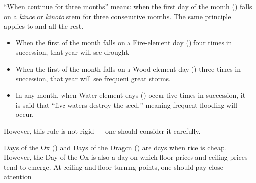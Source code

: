 \commentary
``When  continue for three months'' means: when the first
day of the month () falls on a \textit{kinoe} or
\textit{kinoto} stem for three consecutive months. The same principle
applies to  and all the rest.


\begin{sokyubox}
{\small\itshape\color{sokyubar} }

\medskip
\begin{itemize}[nosep]
\item When the first of the month falls on a Fire-element day () four times in succession, that year will see drought.
\item When the first of the month falls on a Wood-element day () three times in succession, that year will see frequent great storms.
\item In any month, when Water-element days () occur five times in succession, it is said that ``five waters destroy the seed,'' meaning frequent flooding will occur.
\end{itemize}

\medskip
However, this rule is not rigid --- one should consider it carefully.
\end{sokyubox}


\begin{sokyubox}
{\small\itshape\color{sokyubar} }

\medskip
Days of the Ox () and Days of the Dragon
() are days when rice is cheap. However, the
Day of the Ox is also a day on which floor prices and ceiling prices
tend to emerge. At ceiling and floor turning points, one should pay
close attention.
\end{sokyubox}


